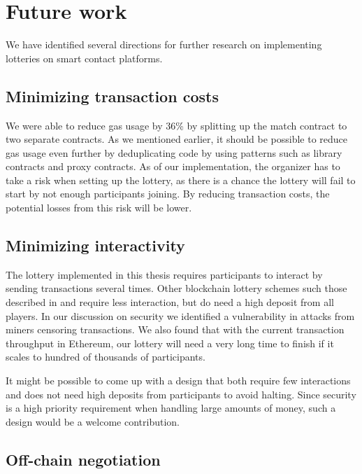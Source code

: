 \section{Future work}
\label{sec:future-work}

We have identified several directions for further research on implementing lotteries on smart contact platforms.

\subsection{Minimizing transaction costs}

We were able to reduce gas usage by 36\% by splitting up the match contract to two separate contracts. As we mentioned earlier, it should be possible to reduce gas usage even further by deduplicating code by using patterns such as library contracts and proxy contracts. As of our implementation, the organizer has to take a risk when setting up the lottery, as there is a chance the lottery will fail to start by not enough participants joining. By reducing transaction costs, the potential losses from this risk will be lower.

\subsection{Minimizing interactivity}

The lottery implemented in this thesis requires participants to interact by sending transactions several times. Other blockchain lottery schemes such those described in \cite{andrychowicz_secure_2014} and \cite{bentov_how_2014} require less interaction, but do need a high deposit from all players. In our discussion on security we identified a vulnerability in attacks from miners censoring transactions. We also found that with the current transaction throughput in Ethereum, our lottery will need a very long time to finish if it scales to hundred of thousands of participants. 

It might be possible to come up with a design that both require few interactions and does not need high deposits from participants to avoid halting. Since security is a high priority requirement when handling large amounts of money, such a design would be a welcome contribution.

\subsection{Off-chain negotiation}

